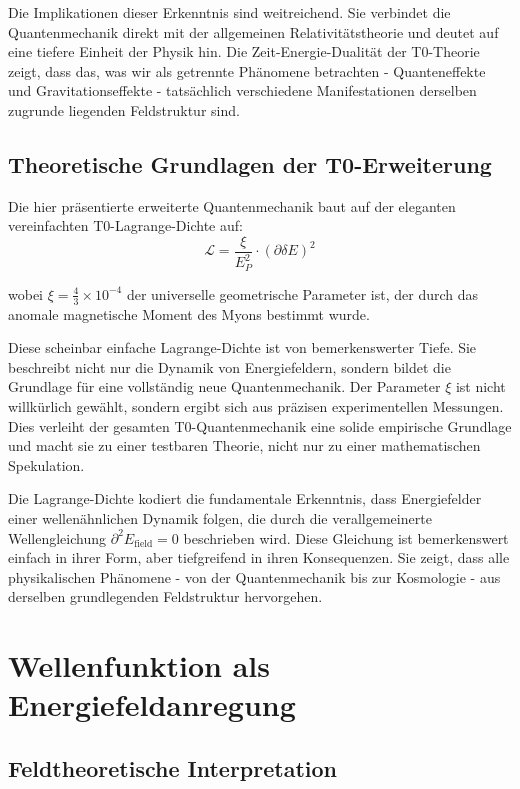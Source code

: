 \documentclass[12pt,a4paper]{article}
\newcommand{\deltaE}{\delta E}
\newcommand{\xipar}{\xi}
\newcommand{\EPlanck}{E_P}
\theoremstyle{definition}
\theoremstyle{remark}
\begin{document}
Die Implikationen dieser Erkenntnis sind weitreichend. Sie verbindet die Quantenmechanik direkt mit der allgemeinen Relativitätstheorie und deutet auf eine tiefere Einheit der Physik hin. Die Zeit-Energie-Dualität der T0-Theorie zeigt, dass das, was wir als getrennte Phänomene betrachten - Quanteneffekte und Gravitationseffekte - tatsächlich verschiedene Manifestationen derselben zugrunde liegenden Feldstruktur sind.

\subsection{Theoretische Grundlagen der T0-Erweiterung}

Die hier präsentierte erweiterte Quantenmechanik baut auf der eleganten vereinfachten T0-Lagrange-Dichte auf:
\begin{equation}
	\mathcal{L} = \frac{\xipar}{\EPlanck^2} \cdot (\partial \deltaE)^2
\end{equation}

wobei $\xipar = \frac{4}{3} \times 10^{-4}$ der universelle geometrische Parameter ist, der durch das anomale magnetische Moment des Myons bestimmt wurde.

Diese scheinbar einfache Lagrange-Dichte ist von bemerkenswerter Tiefe. Sie beschreibt nicht nur die Dynamik von Energiefeldern, sondern bildet die Grundlage für eine vollständig neue Quantenmechanik. Der Parameter $\xipar$ ist nicht willkürlich gewählt, sondern ergibt sich aus präzisen experimentellen Messungen. Dies verleiht der gesamten T0-Quantenmechanik eine solide empirische Grundlage und macht sie zu einer testbaren Theorie, nicht nur zu einer mathematischen Spekulation.

Die Lagrange-Dichte kodiert die fundamentale Erkenntnis, dass Energiefelder einer wellenähnlichen Dynamik folgen, die durch die verallgemeinerte Wellengleichung $\partial^2 E_{\text{field}} = 0$ beschrieben wird. Diese Gleichung ist bemerkenswert einfach in ihrer Form, aber tiefgreifend in ihren Konsequenzen. Sie zeigt, dass alle physikalischen Phänomene - von der Quantenmechanik bis zur Kosmologie - aus derselben grundlegenden Feldstruktur hervorgehen.

\section{Wellenfunktion als Energiefeldanregung}

\subsection{Feldtheoretische Interpretation}
\end{document}
